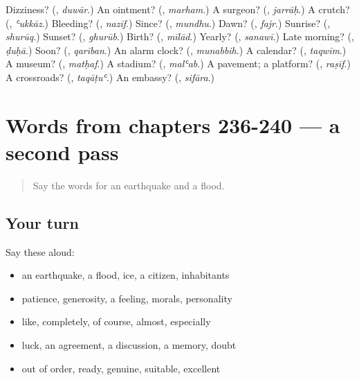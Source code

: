 \begin{tcolorbox}[breakable,colback=teal!4,colframe=teal!35!black,title={Before you move on}]
Dizziness? (\textbf{}, \emph{duwār}.) An ointment? (\textbf{}, \emph{marham}.) A surgeon? (\textbf{}, \emph{jarrāḥ}.) A crutch? (\textbf{}, \emph{ʿukkāz}.) Bleeding? (\textbf{}, \emph{nazīf}.) Since? (\textbf{}, \emph{mundhu}.) Dawn? (\textbf{}, \emph{fajr}.) Sunrise? (\textbf{}, \emph{shurūq}.) Sunset? (\textbf{}, \emph{ghurūb}.) Birth? (\textbf{}, \emph{mīlād}.) Yearly? (\textbf{}, \emph{sanawī}.) Late morning? (\textbf{}, \emph{ḍuḥā}.) Soon? (\textbf{}, \emph{qarīban}.) An alarm clock? (\textbf{}, \emph{munabbih}.) A calendar? (\textbf{}, \emph{taqwīm}.) A museum? (\textbf{}, \emph{matḥaf}.) A stadium? (\textbf{}, \emph{malʿab}.) A pavement; a platform? (\textbf{}, \emph{raṣīf}.) A crossroads? (\textbf{}, \emph{taqāṭuʿ}.) An embassy? (\textbf{}, \emph{sifāra}.)
\end{tcolorbox}
\section[(dialogue)]{Words from chapters 236-240 — a second pass}

\label{lesson:AR-R240-second-pass-words-from-chapters-236-240}



\begin{quote}
Say the words for an earthquake and a flood.
\end{quote}

\subsection*{Your turn}
Say these aloud:

\begin{itemize}
\raggedright
  \item an earthquake, a flood, ice, a citizen, inhabitants
  \item patience, generosity, a feeling, morals, personality
  \item like, completely, of course, almost, especially
  \item luck, an agreement, a discussion, a memory, doubt
  \item out of order, ready, genuine, suitable, excellent
\end{itemize}

